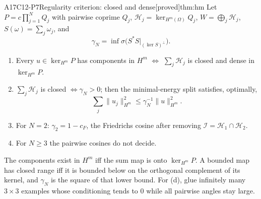 \documentclass[11pt,a4paper,oneside]{report}
\newcommand{\badge}[2]{\textcolor{#1}{\textsf{\footnotesize[#2]}}}
\newcommand{\proved}{\badge{cC}{proved}}
\newenvironment{dimcard}[5]{\par\Needspace{12\baselineskip}\begin{dimcardbox}{#1}{#2}{#3}{#4}{#5}}{\end{dimcardbox}}
\begin{document}
\begin{dimcard}{A17}{C12-P7}{Regularity criterion: closed and dense}{\proved}{thm:hm}
Let $P=c\prod_{j=1}^NQ_j$ with pairwise coprime $Q_j$, $\mathcal H_j=\ker_{H^m(\Omega)}Q_j$, $W=\bigoplus_j\mathcal H_j$, $S(\omega)=\sum_j\omega_j$, and
\[
\gamma_N=\inf\sigma\big(S^*S\big|_{(\ker S)^\perp}\big).
\]
\begin{enumerate}[label=(\alph*)]
\item Every $u\in\ker_{H^m}P$ has components in $H^m$ $\iff$ $\sum_j\mathcal H_j$ is closed and dense in $\ker_{H^m}P$.
\item $\sum_j\mathcal H_j$ is closed $\iff\gamma_N>0$; then the minimal-energy split satisfies, optimally,
\[
\sum_j\|u_j\|_{H^m}^2\le\gamma_N^{-1}\|u\|_{H^m}^2 .
\]
\item For $N=2$: $\gamma_2=1-c_F$, the Friedrichs cosine after removing $\mathcal I=\mathcal H_1\cap\mathcal H_2$.
\item For $N\ge3$ the pairwise cosines do not decide.
\end{enumerate}
\end{dimcard}

\begin{proofidea}
The components exist in $H^m$ iff the sum map is onto $\ker_{H^m}P$. A bounded map has closed range iff it is bounded below on the orthogonal complement of its kernel, and $\gamma_N$ is the square of that lower bound. For (d), glue infinitely many $3\times3$ examples whose conditioning tends to $0$ while all pairwise angles stay large.
\end{proofidea}
\end{document}
